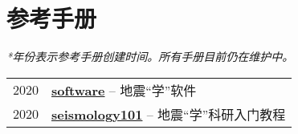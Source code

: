 \section*{参考手册}

\textit{*年份表示参考手册创建时间。所有手册目前仍在维护中。}

\begin{tabular}{p{} p{}}
2020 &	\textbf{\href{https://seismo-learn.org/software/}{software}} -- 地震“学”软件 \\
2020 &	\textbf{\href{https://seismo-learn.org/seismology101/}{seismology101}} -- 地震“学”科研入门教程 \\
\end{tabular}

